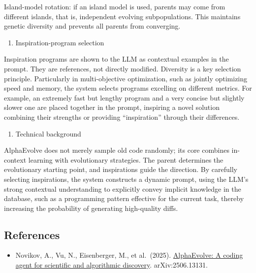 Island-model rotation: if an island model is used, parents may come from different islands, that is, independent evolving subpopulations. This maintains genetic diversity and prevents all parents from converging.

\begin{enumerate}
\def\labelenumi{\arabic{enumi}.}
\setcounter{enumi}{1}
\tightlist
\item
  Inspiration-program selection
\end{enumerate}

Inspiration programs are shown to the LLM as contextual examples in the prompt. They are references, not directly modified. Diversity is a key selection principle. Particularly in multi-objective optimization, such as jointly optimizing speed and memory, the system selects programs excelling on different metrics. For example, an extremely fast but lengthy program and a very concise but slightly slower one are placed together in the prompt, inspiring a novel solution combining their strengths or providing ``inspiration'' through their differences.

\begin{enumerate}
\def\labelenumi{\arabic{enumi}.}
\setcounter{enumi}{2}
\tightlist
\item
  Technical background
\end{enumerate}

AlphaEvolve does not merely sample old code randomly; its core combines in-context learning with evolutionary strategies. The parent determines the evolutionary starting point, and inspirations guide the direction. By carefully selecting inspirations, the system constructs a dynamic prompt, using the LLM's strong contextual understanding to explicitly convey implicit knowledge in the database, such as a programming pattern effective for the current task, thereby increasing the probability of generating high-quality diffs.

\FloatBarrier
{}
\hypertarget{references-121}{%
\subsection{References}\label{references-121}}

\vspace{0.25em}
\begin{itemize}
\tightlist
\item
  Novikov, A., Vu, N., Eisenberger, M., et al.~(2025). \href{https://arxiv.org/abs/2506.13131}{AlphaEvolve: A coding agent for scientific and algorithmic discovery}. arXiv:2506.13131.
\end{itemize}

\clearpage
